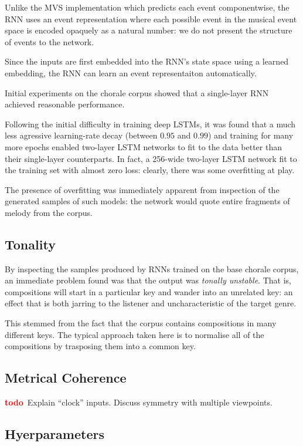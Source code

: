 \documentclass[12pt,a4paper,twoside,openright]{report}
\newcommand{\todo}{\textcolor{red}{\textbf{todo}~}}
\begin{document}
Unlike the MVS implementation which predicts each event componentwise, the RNN
uses an event representation where each possible event in the musical event
space is encoded opaquely as a natural number: we do not present the structure
of events to the network.

Since the inputs are first embedded into the RNN's state space using a learned
embedding, the RNN can learn an event representaiton automatically.

Initial experiments on the chorale corpus showed that a single-layer RNN
achieved reasonable performance. 

Following the initial difficulty in training deep LSTMs, it was found that a
much less agressive learning-rate decay (between $0.95$ and $0.99$) and training
for many more epochs enabled two-layer LSTM networks to fit to the data better
than their single-layer counterparts. In fact, a 256-wide two-layer LSTM network
fit to the training set with almost zero loss: clearly, there was some
overfitting at play.

The presence of overfitting was immediately apparent from inspection of the
generated samples of such models: the network would quote entire fragments of
melody from the corpus.

\subsection{Tonality}

By inspecting the samples produced by RNNs trained on the base chorale corpus,
an immediate problem found was that the output was \emph{tonally unstable}. That
is, compositions will start in a particular key and wander into an unrelated
key: an effect that is both jarring to the listener and uncharacteristic of the
target genre.

This stemmed from the fact that the corpus contains compositions in many
different keys. The typical approach taken here is to normalise all of the
compositions by trasposing them into a common key.

\subsection{Metrical Coherence}

\todo Explain ``clock'' inputs. Discuss symmetry with multiple viewpoints.

\subsection{Hyerparameters}
\end{document}
